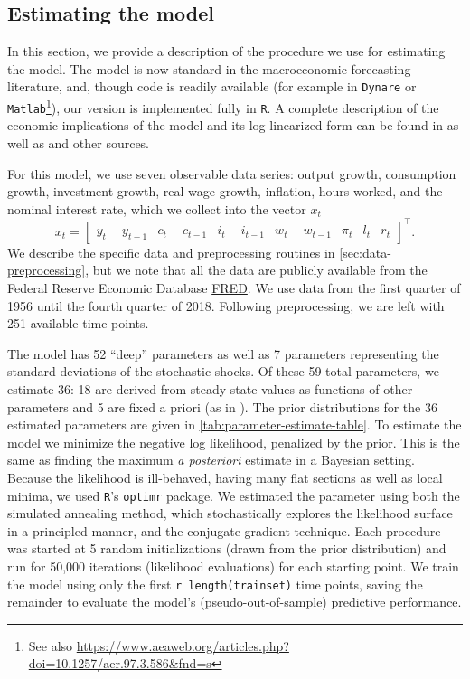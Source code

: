 \documentclass[11pt]{article}
\begin{document}
\subsection{Estimating the \citet{SmetsWouters2007} model}
\label{sec:estim-sw-model}

In this section, we provide a description of the procedure we use for
estimating the \citet{SmetsWouters2007} model. The model is now standard
in the macroeconomic forecasting literature, and, though code is readily
available (for example in \texttt{Dynare} or
\texttt{Matlab}\footnote{See also
  \url{https://www.aeaweb.org/articles.php?doi=10.1257/aer.97.3.586&fnd=s}}),
our version is implemented fully in \texttt{R}. A complete description
of the economic implications of the model and its log-linearized form
can be found in \citep{SmetsWouters2007} as well as \citet{Iskrev2009}
and other sources.

For this model, we use seven observable data series: output growth,
consumption growth, investment growth, real wage growth, inflation,
hours worked, and the nominal interest rate, which we collect into the
vector \(x_t\) \begin{equation}
  x_t = \begin{bmatrix} y_t-y_{t-1} & c_t - c_{t-1} & i_t-i_{t-1} &
    w_t-w_{t-1} & \pi_t & l_t & r_t \end{bmatrix}^\top.
\end{equation} We describe the specific data and preprocessing routines
in \autoref{sec:data-preprocessing}, but we note that all the data are
publicly available from the Federal Reserve Economic Database
\href{http://research.stlouisfed.org/fred2/}{FRED}. We use data from the
first quarter of 1956 until the fourth quarter of 2018. Following
preprocessing, we are left with 251 available time points.

The model has 52 ``deep'' parameters as well as 7 parameters
representing the standard deviations of the stochastic shocks. Of these
59 total parameters, we estimate 36: 18 are derived from steady-state
values as functions of other parameters and 5 are fixed a priori (as in
\citealt{SmetsWouters2007}). The prior distributions for the 36
estimated parameters are given in
\autoref{tab:parameter-estimate-table}. To estimate the model we
minimize the negative log likelihood, penalized by the prior. This is
the same as finding the maximum \emph{a posteriori} estimate in a
Bayesian setting. Because the likelihood is ill-behaved, having many
flat sections as well as local minima, we used \texttt{R}'s
\texttt{optimr} package. We estimated the parameter using both the
simulated annealing method, which stochastically explores the likelihood
surface in a principled manner, and the conjugate gradient technique.
Each procedure was started at 5 random initializations (drawn from the
prior distribution) and run for 50,000 iterations (likelihood
evaluations) for each starting point. We train the model using only the
first \texttt{r\ length(trainset)} time points, saving the remainder to
evaluate the model's (pseudo-out-of-sample) predictive performance.
\end{document}
